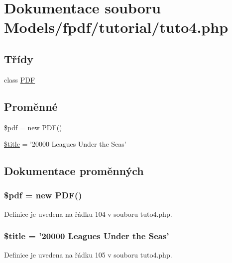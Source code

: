 \hypertarget{tuto4_8php}{\section{Dokumentace souboru Models/fpdf/tutorial/tuto4.php}
\label{tuto4_8php}
}
\subsection*{Třídy}
\begin{DoxyCompactItemize}
\item 
class \hyperlink{class_p_d_f}{P\-D\-F}
\end{DoxyCompactItemize}
\subsection*{Proměnné}
\begin{DoxyCompactItemize}
\item 
\hyperlink{tuto4_8php_a964ee5ee597c515cbb4dad2f14054cb4}{\$pdf} = new \hyperlink{class_p_d_f}{P\-D\-F}()
\item 
\hyperlink{tuto4_8php_ada57e7bb7c152edad18fe2f166188691}{\$title} = '20000 Leagues Under the Seas'
\end{DoxyCompactItemize}


\subsection{Dokumentace proměnných}
\hypertarget{tuto4_8php_a964ee5ee597c515cbb4dad2f14054cb4}{
\subsubsection[{\$pdf}]{\setlength{\rightskip}{0pt plus 5cm}\$pdf = new {\bf P\-D\-F}()}}\label{tuto4_8php_a964ee5ee597c515cbb4dad2f14054cb4}


Definice je uvedena na řádku 104 v souboru tuto4.\-php.

\hypertarget{tuto4_8php_ada57e7bb7c152edad18fe2f166188691}{
\subsubsection[{\$title}]{\setlength{\rightskip}{0pt plus 5cm}\$title = '20000 Leagues Under the Seas'}}\label{tuto4_8php_ada57e7bb7c152edad18fe2f166188691}


Definice je uvedena na řádku 105 v souboru tuto4.\-php.

